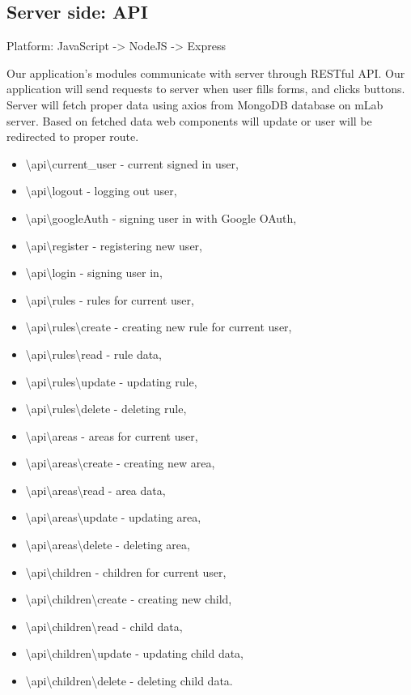\documentclass{sprawozdanie-agh}
\begin{document}
		\subsection{Server side: API}

			Platform: JavaScript -> NodeJS -> Express

			Our application's modules communicate with server through RESTful API. Our application will send requests to server when user fills forms, and clicks buttons. Server will fetch proper data using axios from MongoDB database on mLab server. Based on fetched data web components will update or user will be redirected to proper route.
			
			\begin{itemize}
				\item \textbackslash api\textbackslash current\_user - current signed in user,
				\item \textbackslash api\textbackslash logout - logging out user,
				\item \textbackslash api\textbackslash googleAuth - signing user in with Google OAuth,
				\item \textbackslash api\textbackslash register - registering new user,
				\item \textbackslash api\textbackslash login - signing user in,
				\item \textbackslash api\textbackslash rules - rules for current user,
				\item \textbackslash api\textbackslash rules\textbackslash create - creating new rule for current user,
				\item \textbackslash api\textbackslash rules\textbackslash read - rule data,
				\item \textbackslash api\textbackslash rules\textbackslash update - updating rule,
				\item \textbackslash api\textbackslash rules\textbackslash delete - deleting rule,
				\item \textbackslash api\textbackslash areas - areas for current user,
				\item \textbackslash api\textbackslash areas\textbackslash create - creating new area,
				\item \textbackslash api\textbackslash areas\textbackslash read - area data,
				\item \textbackslash api\textbackslash areas\textbackslash update - updating area,
				\item \textbackslash api\textbackslash areas\textbackslash delete - deleting area,	
				\item \textbackslash api\textbackslash children - children for current user,
				\item \textbackslash api\textbackslash children\textbackslash create - creating new child,
				\item \textbackslash api\textbackslash children\textbackslash read - child data,
				\item \textbackslash api\textbackslash children\textbackslash update - updating child data,
				\item \textbackslash api\textbackslash children\textbackslash delete - deleting child data.
			\end{itemize}
\end{document}
